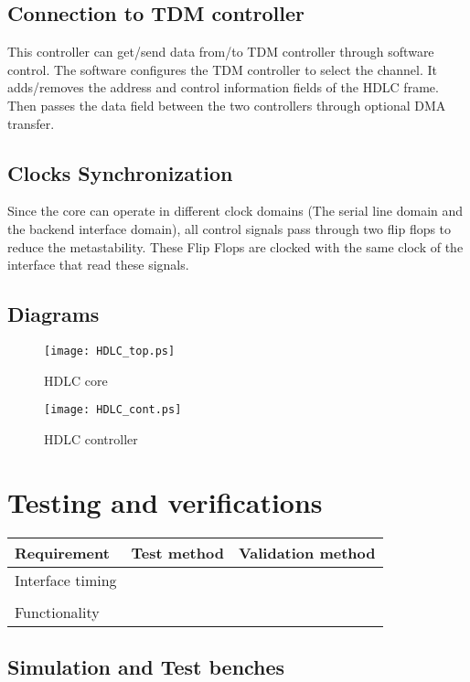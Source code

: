 \documentclass[a4paper,11pt]{article}
\begin{document}
\subsection{Connection to TDM controller}
This controller can get/send data from/to TDM controller through software control. The software configures the TDM controller to select the channel. It adds/removes the address and control information fields of the HDLC frame. Then passes the data field between the two controllers through optional DMA transfer.

\subsection{Clocks Synchronization}
Since the core can operate in different clock domains (The serial line domain and the backend interface domain), all control signals pass through two flip flops to reduce the metastability. These Flip Flops are clocked with the same clock of the interface that read these signals.


\subsection{Diagrams}
\begin{figure}[!h]
\texttt{[image: HDLC\_top.ps]}
\caption{HDLC core}\label{Core}
\end{figure}

\begin{figure}[!h]
\texttt{[image: HDLC\_cont.ps]}
\caption{HDLC controller}\label{controller}
\end{figure}


\section{Testing and verifications}


\begin{tabular}{|l|l|l|}
\hline
Requirement & Test method & Validation method \\
\hline
\hline
Interface timing & &\\
\hline
& & \\
\hline
\hline
Functionality & & \\
\hline
\end{tabular}
\subsection{Simulation and Test benches}
\end{document}

